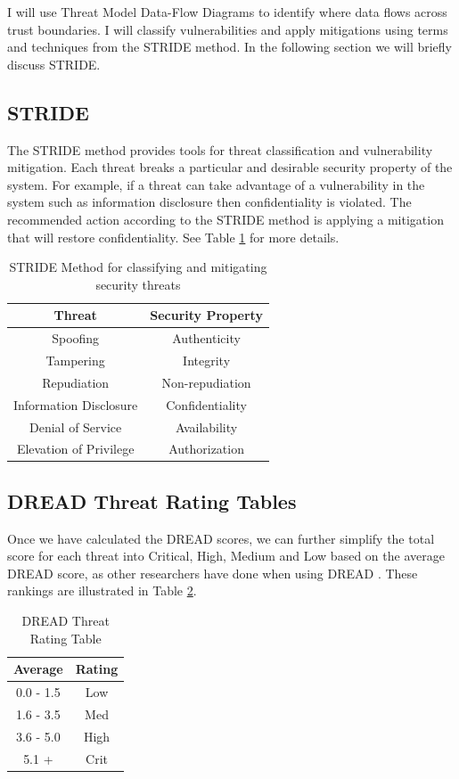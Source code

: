 \documentclass [11pt, proquest] {uwthesis}[2020/02/24]
\begin{document}
I will use Threat Model Data-Flow Diagrams to identify where data flows across trust boundaries.
I will classify vulnerabilities and apply mitigations using terms and techniques from the STRIDE method\cite{hernan_uncover_2019}. In the following section we will briefly discuss STRIDE.

\subsection{STRIDE}
The STRIDE method provides tools for threat classification and vulnerability mitigation. Each threat breaks a particular and desirable security property of the system. For example, if a threat can take advantage of a vulnerability in the system such as information disclosure then confidentiality is violated. The recommended action according to the STRIDE method is applying a mitigation that will restore confidentiality. See Table \ref{STRIDE} for more details.
\begin{table}[H]
\centering
\begin{tabular}{ |c|c| } 
\hline
\textbf{Threat} & \textbf{Security Property} \\
\hline
Spoofing  & Authenticity  \\
\hline
Tampering & Integrity \\ 
\hline
Repudiation & Non-repudiation \\ 
\hline
Information Disclosure & Confidentiality \\ 
\hline
Denial of Service & Availability \\ 
\hline
Elevation of Privilege & Authorization \\ 
\hline
\end{tabular}
\caption{STRIDE Method for classifying and mitigating security threats}
\label{STRIDE}
\end{table}

\subsection{DREAD Threat Rating Tables}
Once we have calculated the DREAD scores, we can further simplify the total score for each threat into Critical, High, Medium and Low based on the average DREAD score, as other researchers have done when using DREAD \cite{kaur_critical_2017}. These rankings are illustrated in Table \ref{DREAD:rating}.


\begin{table}[H]
\centering
\begin{tabular}{ |c|c| } 
\hline
Average & Rating \\
\hline
0.0 - 1.5 & Low \\
\hline
1.6 - 3.5 & Med \\ 
\hline
3.6 - 5.0 & High \\ 
\hline
5.1 + & Crit \\ 
\hline
\end{tabular}
\caption{DREAD Threat Rating Table}
\label{DREAD:rating}
\end{table}
\end{document}
